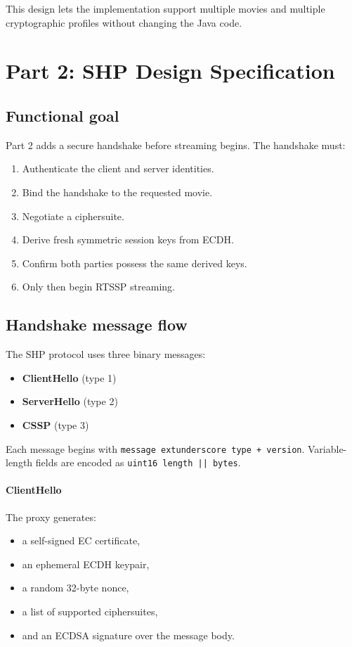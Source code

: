 \documentclass[11pt,a4paper]{article}
\begin{document}
This design lets the implementation support multiple movies and multiple cryptographic profiles without changing the Java code.

\section{Part 2: SHP Design Specification}
\subsection{Functional goal}
Part 2 adds a secure handshake before streaming begins. The handshake must:
\begin{enumerate}[leftmargin=1.2em]
  \item Authenticate the client and server identities.
  \item Bind the handshake to the requested movie.
  \item Negotiate a ciphersuite.
  \item Derive fresh symmetric session keys from ECDH.
  \item Confirm both parties possess the same derived keys.
  \item Only then begin RTSSP streaming.
\end{enumerate}

\subsection{Handshake message flow}
The SHP protocol uses three binary messages:
\begin{itemize}[leftmargin=1.2em]
  \item \textbf{ClientHello} (type 1)
  \item \textbf{ServerHello} (type 2)
  \item \textbf{CSSP} (type 3)
\end{itemize}

Each message begins with \texttt{message	extunderscore type + version}. Variable-length fields are encoded as \texttt{uint16 length || bytes}.

\paragraph{ClientHello}
The proxy generates:
\begin{itemize}[leftmargin=1.2em]
  \item a self-signed EC certificate,
  \item an ephemeral ECDH keypair,
  \item a random 32-byte nonce,
  \item a list of supported ciphersuites,
  \item and an ECDSA signature over the message body.
\end{itemize}
\end{document}
